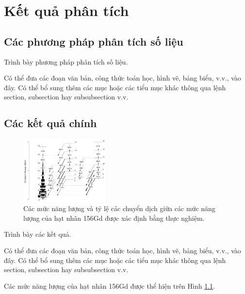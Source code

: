 \chapter{Kết quả phân tích}
\label{ch:ketquaphantich}

\section{Các phương pháp phân tích số liệu}

Trình bày phương pháp phân tích số liệu. 

Có thể đưa các đoạn văn bản, công thức toán học, hình vẽ, bảng biểu, v.v., vào đây. Có thể bổ sung thêm các mục hoặc các tiểu mục khác thông qua lệnh section, subsection hay subsubsection v.v.
\section{Các kết quả chính}

\begin{figure}[!h]
\centering
\includegraphics[width=0.4\textwidth]
{figure/fig_ketquaphantich/156Gd.png}
\caption{Các mức năng lượng và tỷ lệ các chuyển dịch giữa các mức năng lượng của hạt nhân 156Gd được xác định bằng thực nghiệm.}
\label{fig:156Gd}
\end{figure}

Trình bày các kết quả. 

Có thể đưa các đoạn văn bản, công thức toán học, hình vẽ, bảng biểu, v.v., vào đây. Có thể bổ sung thêm các mục hoặc các tiểu mục khác thông qua lệnh section, subsection hay subsubsection v.v.

Các mức năng lượng của hạt nhân 156Gd được thể hiện trên Hình \ref{fig:156Gd}.